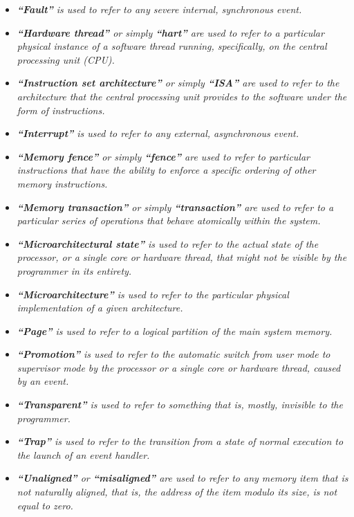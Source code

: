 \begin{itemize}
            \item \textit{\textbf{``Fault''} is used to refer to any severe internal, synchronous event.}

            \item \textit{\textbf{``Hardware thread''} or simply \textbf{``hart''} are used to refer to a particular physical instance of a software thread running, specifically, on the central processing unit (CPU).}

            \item \textit{\textbf{``Instruction set architecture''} or simply \textbf{``ISA''} are used to refer to the architecture that the central processing unit provides to the software under the form of instructions.}

            \item \textit{\textbf{``Interrupt''} is used to refer to any external, asynchronous event.}

            \item \textit{\textbf{``Memory fence''} or simply \textbf{``fence''} are used to refer to particular instructions that have the ability to enforce a specific ordering of other memory instructions.}

            \item \textit{\textbf{``Memory transaction''} or simply \textbf{``transaction''} are used to refer to a particular series of operations that behave atomically within the system.}

            \item \textit{\textbf{``Microarchitectural state''} is used to refer to the actual state of the processor, or a single core or hardware thread, that might not be visible by the programmer in its entirety.}

            \item \textit{\textbf{``Microarchitecture''} is used to refer to the particular physical implementation of a given architecture.}

            \item \textit{\textbf{``Page''} is used to refer to a logical partition of the main system memory.}

            \item \textit{\textbf{``Promotion''} is used to refer to the automatic switch from user mode to supervisor mode by the processor or a single core or hardware thread, caused by an event.}

            \item \textit{\textbf{``Transparent''} is used to refer to something that is, mostly, invisible to the programmer.}

            \item \textit{\textbf{``Trap''} is used to refer to the transition from a state of normal execution to the launch of an event handler.}

            \item \textit{\textbf{``Unaligned''} or \textbf{``misaligned''} are used to refer to any memory item that is not naturally aligned, that is, the address of the item modulo its size, is not equal to zero.}

        \end{itemize}

